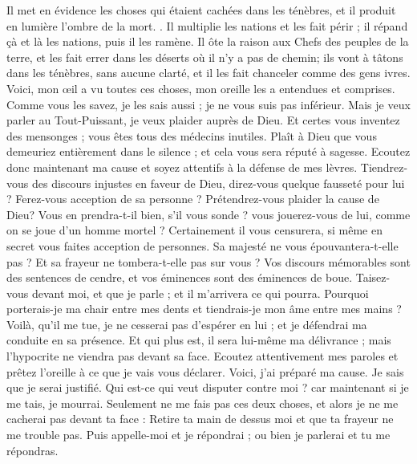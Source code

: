 \begin{multicols}{2}
Il met en évidence les choses qui étaient cachées dans les ténèbres, et il produit en lumière l'ombre de la mort. .
 Il multiplie les nations et les fait périr ; il répand çà et là les nations, puis il les ramène. 
Il ôte la raison aux Chefs des peuples de la terre, et les fait errer dans les déserts où il n'y a pas de chemin;
ils vont à tâtons dans les ténèbres, sans aucune clarté, et il les fait chanceler comme des gens ivres. 
\VerseOne{}Voici, mon œil a vu toutes ces choses, mon oreille les a entendues et comprises.
Comme vous les savez, je les sais aussi ; je ne vous suis pas inférieur. 
Mais je veux parler au Tout-Puissant, je veux plaider auprès de Dieu.
Et certes vous inventez des mensonges ; vous êtes tous des médecins inutiles.
Plaît à Dieu que vous demeuriez entièrement dans le silence ; et cela vous sera réputé à sagesse.
Ecoutez donc maintenant ma cause et soyez attentifs à la défense de mes lèvres.
Tiendrez-vous des discours injustes en faveur de Dieu, direz-vous quelque fausseté pour lui ? 
Ferez-vous acception de sa personne ? Prétendrez-vous plaider la cause de Dieu? 
Vous en prendra-t-il bien, s'il vous sonde ? vous jouerez-vous de lui, comme on se joue d'un homme mortel ? 
Certainement il vous censurera, si même en secret vous faites acception de personnes.
Sa majesté ne vous épouvantera-t-elle pas ? Et sa frayeur ne tombera-t-elle pas sur vous ? 
Vos discours mémorables sont des sentences de cendre, et vos éminences sont des éminences de boue. 
Taisez-vous devant moi, et que je parle ; et il m'arrivera ce qui pourra. 
Pourquoi porterais-je ma chair entre mes dents et tiendrais-je mon âme entre mes mains ?
Voilà, qu'il me tue, je ne cesserai pas d'espérer en lui ; et je défendrai ma conduite en sa présence.
Et qui plus est, il sera lui-même ma délivrance ; mais l'hypocrite ne viendra pas devant sa face.
Ecoutez attentivement mes paroles et prêtez l'oreille à ce que je vais vous déclarer. 
Voici, j'ai préparé ma cause. Je sais que je serai justifié.
Qui est-ce qui veut disputer contre moi ? car maintenant si je me tais, je mourrai. 
Seulement ne me fais pas ces deux choses, et alors je ne me cacherai pas devant ta face :
Retire ta main de dessus moi et que ta frayeur ne me trouble pas.
Puis appelle-moi et je répondrai ; ou bien je parlerai et tu me répondras. 

\end{multicols}
